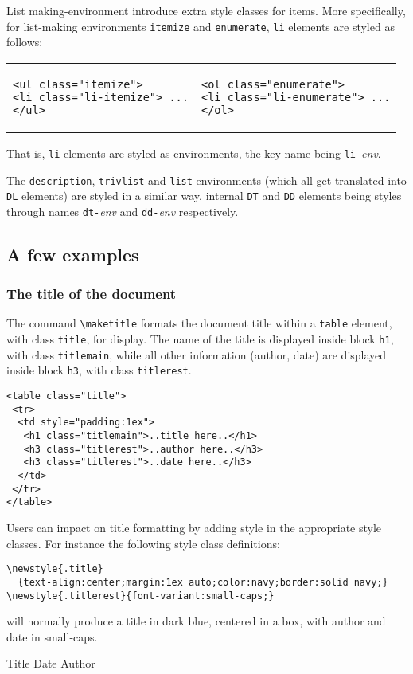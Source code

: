 List making-environment introduce extra style classes for items.
More specifically, for list-making environments
\texttt{itemize} and \texttt{enumerate},
\verb+li+ elements are styled as follows:
\begin{center}
\begin{tabular}{p{.4\linewidth}p{\linewidth}}
\begin{verbatim}
<ul class="itemize">
<li class="li-itemize"> ...
</ul>
\end{verbatim}
&
\begin{verbatim}
<ol class="enumerate">
<li class="li-enumerate"> ...
</ol>
\end{verbatim}
\end{tabular}
\end{center}
That is, \verb+li+ elements are styled as environments, the key name
being \texttt{li-}\textit{env}.

The \texttt{description}, \texttt{trivlist} and \texttt{list} environments
(which all get translated into \texttt{DL} elements) are styled in
a similar way, internal \texttt{DT} and \texttt{DD} elements being
styles through names \texttt{dt-}\textit{env} and
\texttt{dd-}\textit{env} respectively.

\subsection{A few examples}
\subsubsection{The title of the document}
The command \verb+\maketitle+ formats the document
title within a \verb+table+ element, with
class \texttt{title}, for display. The name of the title is displayed
inside block \verb+h1+, with class \texttt{titlemain}, while all other
information (author, date) are displayed inside block \verb+h3+, with class
\texttt{titlerest}.
\begin{verbatim}
<table class="title">
 <tr>
  <td style="padding:1ex">
   <h1 class="titlemain">..title here..</h1>
   <h3 class="titlerest">..author here..</h3>
   <h3 class="titlerest">..date here..</h3>
  </td>
 </tr>
</table>
\end{verbatim}
Users can impact  on title formatting by adding style in the
appropriate style classes.
For instance the following style class definitions:
\begin{verbatim}
\newstyle{.title}
  {text-align:center;margin:1ex auto;color:navy;border:solid navy;}
\newstyle{.titlerest}{font-variant:small-caps;}
\end{verbatim}
will normally produce a title in dark blue, centered in a box, with
author and date in small-caps.
\begin{htmlonly}
Title
Date
Author
\end{htmlonly}

